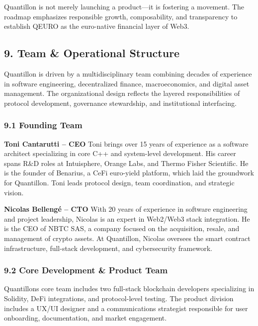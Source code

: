 Quantillon is not merely launching a product---it is fostering a
movement. The roadmap emphasizes responsible growth, composability, and
transparency to establish QEURO as the euro-native financial layer of
Web3.

\hypertarget{team-operational-structure}{%
\subsection{9. Team \& Operational
Structure}\label{team-operational-structure}}

Quantillon is driven by a multidisciplinary team combining decades of
experience in software engineering, decentralized finance,
macroeconomics, and digital asset management. The organizational design
reflects the layered responsibilities of protocol development,
governance stewardship, and institutional interfacing.

\hypertarget{founding-team}{%
\subsubsection{9.1 Founding Team}\label{founding-team}}

\textbf{Toni Cantarutti -- CEO} Toni brings over 15 years of experience
as a software architect specializing in core C++ and system-level
development. His career spans R\&D roles at Intuisphere, Orange Labs,
and Thermo Fisher Scientific. He is the founder of Benarius, a CeFi
euro-yield platform, which laid the groundwork for Quantillon. Toni
leads protocol design, team coordination, and strategic vision.

\textbf{Nicolas Bellengé -- CTO} With 20 years of experience in software
engineering and project leadership, Nicolas is an expert in Web2/Web3
stack integration. He is the CEO of NBTC SAS, a company focused on the
acquisition, resale, and management of crypto assets. At Quantillon,
Nicolas oversees the smart contract infrastructure, full-stack
development, and cybersecurity framework.

\hypertarget{core-development-product-team}{%
\subsubsection{9.2 Core Development \& Product
Team}\label{core-development-product-team}}

Quantillon\textquotesingle s core team includes two full-stack
blockchain developers specializing in Solidity, DeFi integrations, and
protocol-level testing. The product division includes a UX/UI designer
and a communications strategist responsible for user onboarding,
documentation, and market engagement.

